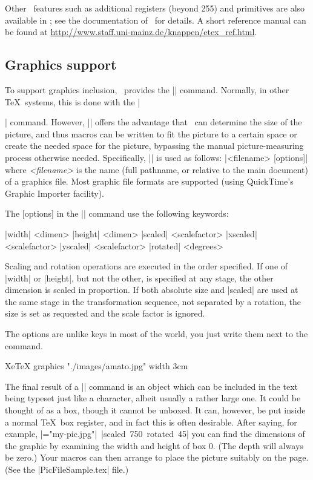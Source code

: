 Other \eTeX\ features such as additional registers (beyond 255) and primitives are also available in \XeTeX; see the documentation of \eTeX\ for details. A short reference manual can be found at \url{http://www.staff.uni-mainz.de/knappen/etex_ref.html}.

\subsection{Graphics support}

To support graphics inclusion, \XeTeX\ provides the |\XeTeXpicfile| command. Normally, in other \TeX\ systems, this is done with the |\special| command. However, |\XeTeXpicfile| offers the advantage that \XeTeX\ can determine the size of the picture, and thus macros can be written to fit the picture to a certain space or create the needed space for the picture, bypassing the manual picture-measuring process otherwise needed. Specifically, |\XeTeXpicfile| is used as follows:\hfil\break\indent\indent
  |\XeTeXpicfile <filename> [options]|\hfil\break
where {\em<filename>} is the name (full pathname, or relative to the main document) of a graphics file. Most graphic file formats are supported (using QuickTime's Graphic Importer facility).

The [options] in the |\XeTeXpicfile| command use the following keywords:{\obeylines \parskip0pt \parindent
  |width| <dimen>
  |height| <dimen>
  |scaled| <scalefactor>
  |xscaled| <scalefactor>
  |yscaled| <scalefactor>
  |rotated| <degrees>\par}\noindent
Scaling and rotation operations are executed in the order specified. If one of |width| or |height|, but not the other, is specified at any stage, the other dimension is scaled in proportion. If both absolute size and |scaled| are used at the same stage in the transformation sequence, not separated by a rotation, the size is set as requested and the scale factor is ignored.

The options are unlike keys in most of the \latexe world, you just write them next to the command.

\begin{texexample}{XeTeX graphics}{}
\XeTeXpicfile "./images/amato.jpg" width 3cm
\end{texexample}

The final result of a |\XeTeXpicfile| command is an object which can be included in the text being typeset just like a character, albeit usually a rather large one. It could be thought of as a box, though it cannot be unboxed. It can, however, be put inside a normal \TeX\ box register, and in fact this is often desirable. After saying, for example,\hfil\break
\indent\indent |=\hbox{\XeTeXpicfile "my-pic.jpg"|\hfil\break
\indent\indent\indent\indent |scaled 750 rotated 45}|\hfil\break
you can find the dimensions of the graphic by examining the width and height of box 0. (The depth will always be zero.) Your macros can then arrange to place the picture suitably on the page. (See the |PicFileSample.tex| file.)



